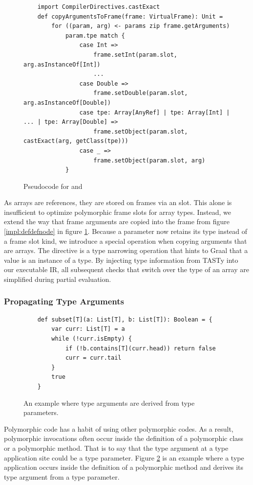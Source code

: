 \begin{figure}[!htb]
	\begin{verbatim}
	import CompilerDirectives.castExact
	def copyArgumentsToFrame(frame: VirtualFrame): Unit = 
		for ((param, arg) <- params zip frame.getArguments) 
			param.tpe match {
				case Int =>
					frame.setInt(param.slot, arg.asInstanceOf[Int])
					...
				case Double =>
					frame.setDouble(param.slot, arg.asInstanceOf[Double])	
				case tpe: Array[AnyRef] | tpe: Array[Int] | ... | tpe: Array[Double] =>
					frame.setObject(param.slot, castExact(arg, getClass(tpe)))
				case _ =>
					frame.setObject(param.slot, arg)
			}
	\end{verbatim}
	\caption{Pseudocode for  and }
	\label{impl:specialized-copy-arguments}
\end{figure}

As arrays are references, they are stored on frames via an  slot.
This alone is insufficient to optimize polymorphic frame slots for array types.
Instead, we extend the way that frame arguments are copied into the frame from figure \ref{impl:defdefnode} in figure \ref{impl:specialized-copy-arguments}.
Because a parameter now retains its type instead of a frame slot kind, we introduce a special operation when copying arguments that are arrays. 
The  directive is a type narrowing operation that hints to Graal that a value is an instance of a type.
By injecting type information from TASTy into our executable IR, all subsequent checks that switch over the type of an array are simplified during partial evaluation.

\subsubsection*{Propagating Type Arguments}

\begin{figure}[!htb]
	\begin{verbatim}
	def subset[T](a: List[T], b: List[T]): Boolean = {
		var curr: List[T] = a
		while (!curr.isEmpty) {
			if (!b.contains[T](curr.head)) return false
			curr = curr.tail
		}
		true 
	}
	\end{verbatim}
	\caption{An example where type arguments are derived from type parameters.}
	\label{impl:list-subset}
\end{figure}

Polymorphic code has a habit of using other polymorphic codes.
As a result, polymorphic invocations often occur inside the definition of a polymorphic class or a polymorphic method.
That is to say that the type argument at a type application site could be a type parameter.
Figure \ref{impl:list-subset} is an example where a type application occurs inside the definition of a polymorphic method and derives its type argument from a type parameter.

